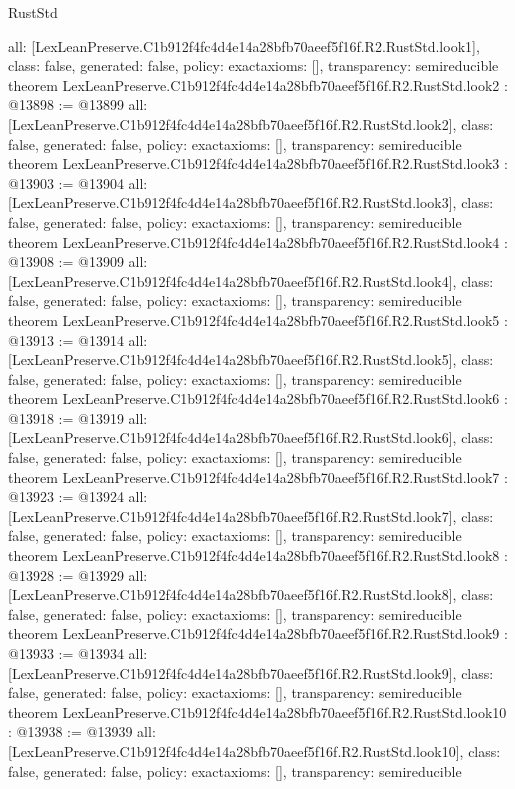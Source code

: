 \begin{lexlean}{RustStd}
\begin{coremodule}
{  all: [LexLeanPreserve.C1b912f4fc4d4e14a28bfb70aeef5f16f.R2.RustStd.look1],
  class: false,
  generated: false,
  policy: exact{axioms: []},
  transparency: semireducible
}
theorem LexLeanPreserve.C1b912f4fc4d4e14a28bfb70aeef5f16f.R2.RustStd.look2 : @13898 := @13899 {
  all: [LexLeanPreserve.C1b912f4fc4d4e14a28bfb70aeef5f16f.R2.RustStd.look2],
  class: false,
  generated: false,
  policy: exact{axioms: []},
  transparency: semireducible
}
theorem LexLeanPreserve.C1b912f4fc4d4e14a28bfb70aeef5f16f.R2.RustStd.look3 : @13903 := @13904 {
  all: [LexLeanPreserve.C1b912f4fc4d4e14a28bfb70aeef5f16f.R2.RustStd.look3],
  class: false,
  generated: false,
  policy: exact{axioms: []},
  transparency: semireducible
}
theorem LexLeanPreserve.C1b912f4fc4d4e14a28bfb70aeef5f16f.R2.RustStd.look4 : @13908 := @13909 {
  all: [LexLeanPreserve.C1b912f4fc4d4e14a28bfb70aeef5f16f.R2.RustStd.look4],
  class: false,
  generated: false,
  policy: exact{axioms: []},
  transparency: semireducible
}
theorem LexLeanPreserve.C1b912f4fc4d4e14a28bfb70aeef5f16f.R2.RustStd.look5 : @13913 := @13914 {
  all: [LexLeanPreserve.C1b912f4fc4d4e14a28bfb70aeef5f16f.R2.RustStd.look5],
  class: false,
  generated: false,
  policy: exact{axioms: []},
  transparency: semireducible
}
theorem LexLeanPreserve.C1b912f4fc4d4e14a28bfb70aeef5f16f.R2.RustStd.look6 : @13918 := @13919 {
  all: [LexLeanPreserve.C1b912f4fc4d4e14a28bfb70aeef5f16f.R2.RustStd.look6],
  class: false,
  generated: false,
  policy: exact{axioms: []},
  transparency: semireducible
}
theorem LexLeanPreserve.C1b912f4fc4d4e14a28bfb70aeef5f16f.R2.RustStd.look7 : @13923 := @13924 {
  all: [LexLeanPreserve.C1b912f4fc4d4e14a28bfb70aeef5f16f.R2.RustStd.look7],
  class: false,
  generated: false,
  policy: exact{axioms: []},
  transparency: semireducible
}
theorem LexLeanPreserve.C1b912f4fc4d4e14a28bfb70aeef5f16f.R2.RustStd.look8 : @13928 := @13929 {
  all: [LexLeanPreserve.C1b912f4fc4d4e14a28bfb70aeef5f16f.R2.RustStd.look8],
  class: false,
  generated: false,
  policy: exact{axioms: []},
  transparency: semireducible
}
theorem LexLeanPreserve.C1b912f4fc4d4e14a28bfb70aeef5f16f.R2.RustStd.look9 : @13933 := @13934 {
  all: [LexLeanPreserve.C1b912f4fc4d4e14a28bfb70aeef5f16f.R2.RustStd.look9],
  class: false,
  generated: false,
  policy: exact{axioms: []},
  transparency: semireducible
}
theorem LexLeanPreserve.C1b912f4fc4d4e14a28bfb70aeef5f16f.R2.RustStd.look10 : @13938 := @13939 {
  all: [LexLeanPreserve.C1b912f4fc4d4e14a28bfb70aeef5f16f.R2.RustStd.look10],
  class: false,
  generated: false,
  policy: exact{axioms: []},
  transparency: semireducible
}
\end{coremodule}
\end{lexlean}

